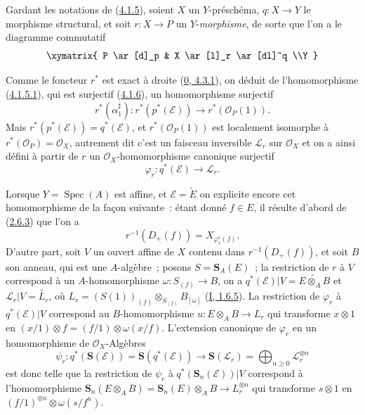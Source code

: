 \begin{env}[4.2.1]
\label{II.4.2.1-fr}
Gardant les notations de (\hyperref[II.4.1.5-fr]{4.1.5}), soient $X$ un
$Y$-préschéma, $q:X\to Y$ le morphisme structural, et soit $r:X\to P$ un
$Y$-\emph{morphisme}, de sorte que l'on a le diagramme commutatif
\[
  \xymatrix{
    P \ar[d]_p & X \ar[l]_r \ar[dl]^q
    \\Y
  }
\]


Comme le foncteur $r^*$ est exact à droite
(\hyperref[0.4.3.1-fr]{0, 4.3.1}), on déduit de l'homomorphisme
(\hyperref[II.4.1.5.1-fr]{4.1.5.1}), qui est surjectif
(\hyperref[II.4.1.6-fr]{4.1.6}), un homomorphisme surjectif
\[
  r^*(\alpha_1^\sharp):r^*(p^*(\mathcal{E}))\longrightarrow
  r^*(\mathcal{O}_P(1)).
\]
Mais $r^*(p^*(\mathcal{E}))=q^*(\mathcal{E})$, et
$r^*(\mathcal{O}_P(1))$ est localement isomorphe à
$r^*(\mathcal{O}_P)=\mathcal{O}_X$, autrement dit c'est un faisceau
inversible $\mathcal{L}_r$ sur $\mathcal{O}_X$ et on a ainsi défini à partir
de $r$ un $\mathcal{O}_X$-homomorphisme canonique surjectif
\[
\label{II.4.2.1.1-fr}
  \varphi_r:q^*(\mathcal{E})\longrightarrow\mathcal{L}_r.
\tag{4.2.1.1}
\]

Lorsque $Y=\operatorname{Spec}(A)$ est affine, et
$\mathcal{E}=\widetilde{E}$ on explicite encore cet homomorphisme de la façon
suivante~: étant donné $f\in E$, il résulte d'abord de
(\hyperref[II.2.6.3-fr]{2.6.3}) que l'on a
\[
\label{II.4.2.1.2-fr}
  r^{-1}(D_+(f))=X_{\varphi_r^\flat(f)}.
\tag{4.2.1.2}
\]
D'autre part, soit $V$ un ouvert affine de $X$ contenu dans
$r^{-1}(D_+(f))$, et soit $B$ son anneau, qui est une $A$-algèbre~; posons
$S=\mathbf{S}_A(E)$~; la restriction de $r$ à $V$ correspond à un
$A$-homomorphisme $\omega:S_{(f)}\to B$, on a
$q^*(\mathcal{E})|V=\widetilde{E\otimes_A B}$ et
$\mathcal{L}_r|V=\widetilde{L_r}$, où
$L_r=(S(1))_{(f)}\otimes_{S_{(f)}}B_{[\omega]}$
(\hyperref[I.1.6.5-fr]{I, 1.6.5}). La restriction de $\varphi_r$ à
$q^*(\mathcal{E})|V$ correspond au $B$-homomorphisme
$u:E\otimes_A B\to L_r$ qui transforme $x\otimes1$ en
$(x/1)\otimes f=(f/1)\otimes\omega(x/f)$. L'extension canonique de
$\varphi_r$ en un homomorphisme de $\mathcal{O}_X$-Algèbres
\[
  \psi_r:q^*(\mathbf{S}(\mathcal{E}))=
  \mathbf{S}(q^*(\mathcal{E}))\longrightarrow
  \mathbf{S}(\mathcal{L}_r)=\bigoplus_{n\geq0}\mathcal{L}_r^{\otimes n}
\]
est donc telle que la restriction de $\psi_r$ à
$q^*(\mathbf{S}_n(\mathcal{E}))|V$ correspond à l'homomorphisme
$\mathbf{S}_n(E\otimes_A B)=\mathbf{S}_n(E)\otimes_A B\to L_r^{\otimes n}$
qui transforme $s\otimes1$ en
$(f/1)^{\otimes n}\otimes\omega(s/f^n)$.
\end{env}

